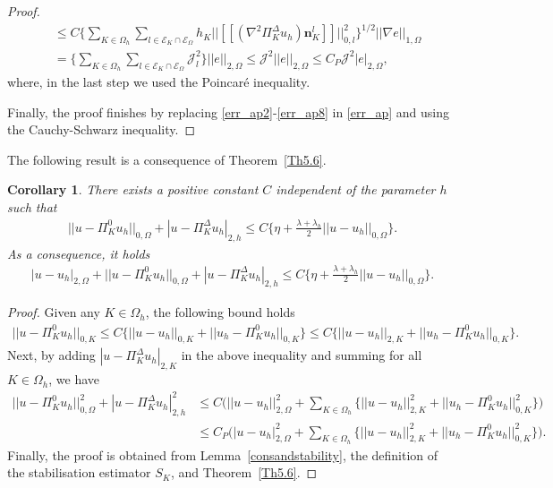 \documentclass[final,reqno]{elsarticle}
\newtheorem{corollary}{Corollary}[section]
\def\O{\Omega}
\def\PiK{\Pi_{K}^{\Delta}}
\begin{document}
\begin{proof}
\begin{align}
        &\leq C \Bigg\{\sum\limits_{K\in \Omega_h}\sum_{l\in \mathcal{E}_K\cap \mathcal{E}_{\O}} h_K\Big|\Big|[\![(\nabla^2\PiK u_h )\boldsymbol{n}_K^l]\!]  \Big|\Big|_{0,l}^{2}\Bigg\}^{1/2}  ||\nabla e||_{1,\Omega}\nonumber\\
        &= \Bigg\{\sum\limits_{K\in \Omega_h}\sum_{l\in \mathcal{E}_K\cap \mathcal{E}_{\O}} \mathcal{J}_{l}^2\Bigg\}||e||_{2,\Omega} \leq  \mathcal{J}^2||e||_{2,\Omega}\leq  C_{P}\mathcal{J}^2|e|_{2,\Omega},\label{err_ap8}
	\end{align}
where, in the last step we used the Poincaré inequality. 


Finally, the proof finishes by replacing \eqref{err_ap2}-\eqref{err_ap8} in \eqref{err_ap} and using the Cauchy-Schwarz inequality. 
\end{proof}

The following result is a consequence of Theorem~\ref{Th5.6}.
\begin{corollary}\label{coroll_MG}
There exists a positive constant $C$ independent of the parameter $h$ such that
\begin{align*}
||u-\Pi_K^0 u_h ||_{0,\Omega}+|u-\Pi_K^{\Delta} u_h|_{2,h}\leq C\Big\{\eta +\frac{\lambda+\lambda_h}{2}||u-u_h ||_{0,\O} \Big\}.
\end{align*}
As a consequence, it holds
\begin{align*}
|u-u_h|_{2,\O}+||u-\Pi_K^0 u_h ||_{0,\Omega}+|u-\Pi_K^{\Delta} u_h|_{2,h}\leq C\Big\{\eta +\frac{\lambda+\lambda_h}{2}||u-u_h ||_{0,\O} \Big\}.
\end{align*}
\end{corollary}
\begin{proof}
Given any $K\in \Omega_h$, the following bound holds 
\begin{align*}
||u-\Pi_K^0 u_h||_{0,K}\leq C \Big\{||u- u_h ||_{0,K}+ ||u_h-\Pi_K^0 u_h||_{0,K} \Big\}\leq C \Big\{||u- u_h ||_{2,K}+ ||u_h-\Pi_K^0 u_h||_{0,K} \Big\}.
\end{align*}
Next, by adding $|u-\PiK u_h|_{2,K}$ in the above inequality and summing for all $K\in \Omega_h$,  we have
\begin{align*}
||u-\Pi_K^0 u_h ||_{0,\O}^2 + |u-\PiK u_h|_{2,h}^2
&\leq C \Bigg( ||u-u_h ||_{2,\Omega}^2 + \sum\limits_{K\in \Omega_h} \Big\{||u- u_h ||_{2,K}^2+ ||u_h-\Pi_K^0 u_h||_{0,K}^2 \Big\} \Bigg)\\
&\leq C_P \Bigg( |u-u_h |_{2,\Omega}^2 + \sum\limits_{K\in \Omega_h} \Big\{||u- u_h ||_{2,K}^2+ ||u_h-\Pi_K^0 u_h||_{0,K}^2 \Big\} \Bigg).
\end{align*}
Finally, the proof is obtained from Lemma~\ref{consandstability}, the definition of the stabilisation estimator $S_K$, and Theorem~\ref{Th5.6}.
\end{proof}
\end{document}
